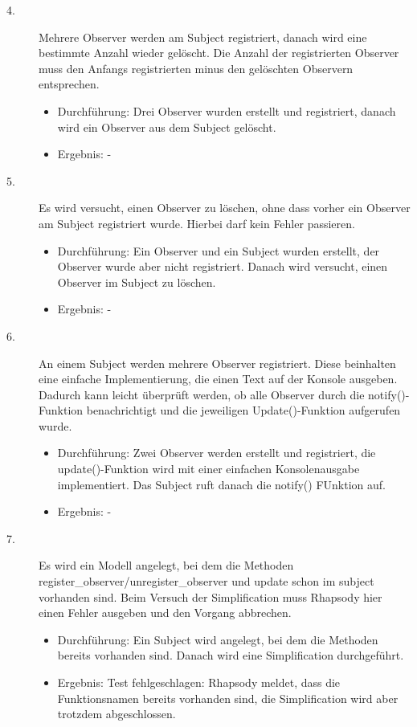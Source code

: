 \begin{description}
	\item[4.]
	Mehrere Observer werden am Subject registriert, danach wird eine bestimmte Anzahl wieder gelöscht. Die Anzahl der registrierten Observer muss den Anfangs registrierten minus den gelöschten Observern entsprechen.
	\begin{itemize}
  		\item{Durchführung:}
			Drei Observer wurden erstellt und registriert, danach wird ein Observer aus
			dem Subject gelöscht.
  		\item{Ergebnis:}
			-
  	\end{itemize}
	
	\item[5.]
	Es wird versucht, einen Observer zu löschen, ohne dass vorher ein Observer am
	Subject registriert wurde. Hierbei darf kein Fehler passieren.
	\begin{itemize}
  		\item{Durchführung:}
			Ein Observer und ein Subject wurden erstellt, der Observer wurde aber nicht
			registriert. Danach wird versucht, einen Observer im Subject zu löschen.
  		\item{Ergebnis:}
			-
  	\end{itemize}
  	
	\item[6.]
	An einem Subject werden mehrere Observer registriert. Diese beinhalten eine einfache Implementierung, die einen Text auf der Konsole ausgeben. Dadurch kann leicht überprüft werden, ob alle Observer durch die notify()-Funktion benachrichtigt und die jeweiligen Update()-Funktion aufgerufen wurde.
	\begin{itemize}
  		\item{Durchführung:}
			Zwei Observer werden erstellt und registriert, die update()-Funktion wird
			mit einer einfachen Konsolenausgabe implementiert. Das Subject ruft danach
			die notify() FUnktion auf.
  		\item{Ergebnis:}
			-
  	\end{itemize}
  	
	\item[7.]
	Es wird ein Modell angelegt, bei dem die Methoden
	register_observer/unregister_observer und update schon im subject vorhanden
	sind.
	Beim Versuch der Simplification muss Rhapsody hier einen Fehler ausgeben und den Vorgang abbrechen.
	\begin{itemize}
  		\item{Durchführung:}
			Ein Subject wird angelegt, bei dem die Methoden bereits vorhanden sind.
			Danach wird eine Simplification durchgeführt.
  		\item{Ergebnis:}
			Test fehlgeschlagen: Rhapsody meldet, dass die Funktionsnamen bereits
			vorhanden sind, die Simplification wird aber trotzdem abgeschlossen.
  	\end{itemize}
	

\end{description}
